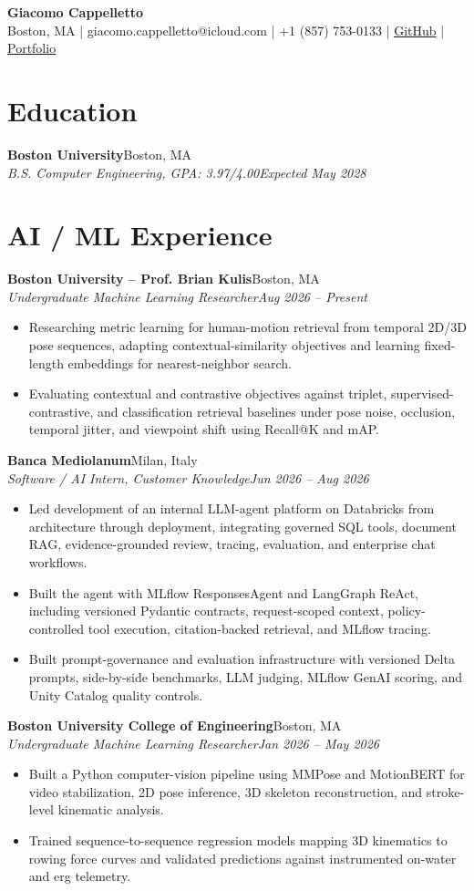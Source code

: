 \documentclass[letterpaper,10pt]{article}
\newcommand{\e}[4]{\textbf{#1}\hfill #2\\\textit{#3}\hfill\textit{#4}\vspace{-3pt}}\newcommand{\bi}{\begin{itemize}[leftmargin=.17in,itemsep=0pt,topsep=2pt]}\newcommand{\ei}{\end{itemize}\vspace{-4pt}}
\begin{document}
{\Large\textbf{Giacomo Cappelletto}}\\[-1pt]Boston, MA | giacomo.cappelletto@icloud.com | +1 (857) 753-0133 | \href{https://github.com/JJCAPPE}{GitHub} | \href{https://cv-nu-sage.vercel.app/}{Portfolio}
\section{Education}\e{Boston University}{Boston, MA}{B.S. Computer Engineering, GPA: 3.97/4.00}{Expected May 2028}
\section{AI / ML Experience}
\e{Boston University -- Prof. Brian Kulis}{Boston, MA}{Undergraduate Machine Learning Researcher}{Aug 2026 -- Present}\bi
\item Researching metric learning for human-motion retrieval from temporal 2D/3D pose sequences, adapting contextual-similarity objectives and learning fixed-length embeddings for nearest-neighbor search.
\item Evaluating contextual and contrastive objectives against triplet, supervised-contrastive, and classification retrieval baselines under pose noise, occlusion, temporal jitter, and viewpoint shift using Recall@K and mAP.\ei
\e{Banca Mediolanum}{Milan, Italy}{Software / AI Intern, Customer Knowledge}{Jun 2026 -- Aug 2026}\bi
\item Led development of an internal LLM-agent platform on Databricks from architecture through deployment, integrating governed SQL tools, document RAG, evidence-grounded review, tracing, evaluation, and enterprise chat workflows.
\item Built the agent with MLflow ResponsesAgent and LangGraph ReAct, including versioned Pydantic contracts, request-scoped context, policy-controlled tool execution, citation-backed retrieval, and MLflow tracing.
\item Built prompt-governance and evaluation infrastructure with versioned Delta prompts, side-by-side benchmarks, LLM judging, MLflow GenAI scoring, and Unity Catalog quality controls.\ei
\e{Boston University College of Engineering}{Boston, MA}{Undergraduate Machine Learning Researcher}{Jan 2026 -- May 2026}\bi
\item Built a Python computer-vision pipeline using MMPose and MotionBERT for video stabilization, 2D pose inference, 3D skeleton reconstruction, and stroke-level kinematic analysis.
\item Trained sequence-to-sequence regression models mapping 3D kinematics to rowing force curves and validated predictions against instrumented on-water and erg telemetry.\ei
\end{document}
